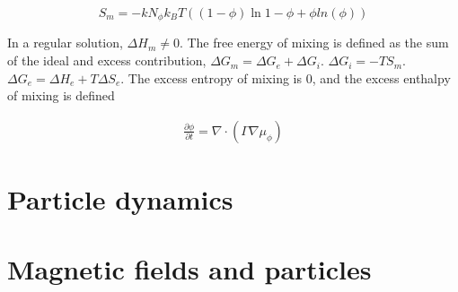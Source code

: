 \begin{equation}
    S_m = -k N_\phi k_B T((1 - \phi)\ln{1 - \phi} + \phi ln(\phi)) 
\end{equation}

In a regular solution, $\Delta H_m \neq 0$. The free energy of mixing is defined as the sum of the ideal and excess contribution, $\Delta G_m = \Delta G_e + \Delta G_i$.
$\Delta G_i = -TS_m$. $\Delta G_e = \Delta H_e + T \Delta S_e$. The excess entropy of mixing is 0, and the excess enthalpy of mixing is defined 


\begin{equation}
    \begin{split}
    \frac{\partial\phi}{\partial t} = \nabla \cdot \left( \Gamma  \nabla\mu_\phi \right)
    \end{split}
\end{equation}

\section{Particle dynamics}

\section{Magnetic fields and particles}







